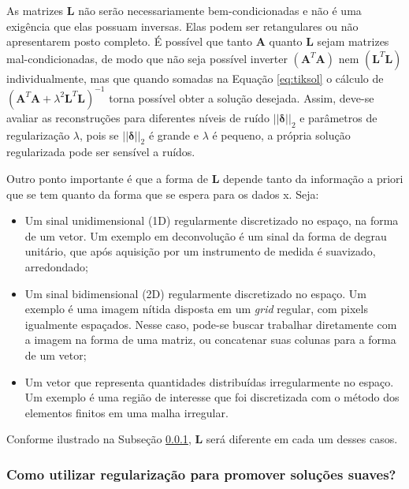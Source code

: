 As matrizes $\mathbf{L}$ não serão  necessariamente bem-condicionadas e não é uma exigência que elas possuam inversas. Elas podem ser retangulares ou não apresentarem posto completo. É possível que tanto $\mathbf{A}$ quanto $\mathbf{L}$ sejam matrizes mal-condicionadas, de modo que não seja possível inverter $\left(\mathbf{A}^T \mathbf{A} \right)$ nem $\left( \mathbf{L}^T \mathbf{L} \right)$ individualmente, mas que quando somadas na Equação \eqref{eq:tiksol} o cálculo de $\left(\mathbf{A}^T \mathbf{A} + \lambda^2 \mathbf{L}^T \mathbf{L}\right)^{-1} $ torna possível obter a solução desejada.  Assim, deve-se avaliar as reconstruções para diferentes níveis de ruído $\vert \vert \bm{\delta} \vert \vert _2$ e parâmetros de regularização $\lambda$, pois se $\vert \vert \bm{\delta} \vert \vert _2$ é grande e $\lambda$ é pequeno, a própria solução regularizada pode ser sensível a ruídos. 

Outro ponto importante é que a forma de $\mathbf{L}$ depende tanto da informação a priori que
se tem quanto da forma que se espera para os dados x. Seja:
\begin{itemize}
\item Um sinal unidimensional (1D) regularmente discretizado no espaço, na forma de um vetor. Um exemplo em deconvolução é um sinal da forma de degrau unitário, que após aquisição por um instrumento de medida é suavizado, arredondado;

\item Um sinal bidimensional (2D) regularmente discretizado no espaço. Um exemplo é uma imagem nítida disposta em um \textit{grid} regular, com pixels igualmente espaçados. Nesse caso, pode-se buscar trabalhar diretamente com a imagem na forma de uma matriz, ou concatenar suas colunas para a forma de um vetor;

\item Um vetor que representa quantidades distribuídas irregularmente no espaço. Um exemplo é uma região de interesse que foi discretizada com o método dos elementos finitos em uma malha irregular.
\end{itemize}

Conforme ilustrado na Subseção \ref{sec:suave}, $\mathbf{L}$ será diferente em cada um desses casos.

 \subsubsection{Como utilizar regularização para promover soluções suaves?}\label{sec:suave}

